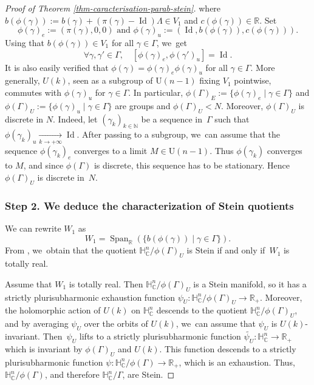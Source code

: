 \documentclass[11pt]{article}
\theoremstyle{definition}
\newcommand{\C}{\mathbb{C}}
\newcommand{\R}{\mathbb{R}}
\newcommand{\N}{\mathbb{N}}
\newcommand{\HNC}{\mathbb{H}^{n}_{\C}}
\DeclareMathOperator{\Id}{Id}
\def\C{\mathbb{C}}
\newcommand{\HNC}{\mathbb{H}^{n}_{\C}}
\begin{document}
\begin{proof}[Proof of Theorem \ref{thm-caracterisation-parab-stein}]
where $b(\phi(\gamma)):= b(\gamma) + (\pi(\gamma)-\Id)\Lambda \in V_1$ and $c(\phi(\gamma)) \in \R$. Set
\begin{equation*}
\phi(\gamma)_e:= (\pi(\gamma),0,0) \text{ and }
\phi(\gamma)_u:= (\Id,b(\phi(\gamma)),c(\phi(\gamma))).
\end{equation*}
Using that $b(\phi(\gamma))\in V_1$ for all $\gamma\in \Gamma$, we~get
\begin{equation*}
\forall \gamma,\gamma'\in \Gamma,\quad [\phi(\gamma)_e,\phi(\gamma')_u] = \Id.
\end{equation*}It is also easily verified that $\phi(\gamma) = \phi(\gamma)_e\phi(\gamma)_u$ for all $\gamma \in \Gamma$.
More generally, $U(k)$, seen as a subgroup of $\mathrm{U}(n-1)$ fixing $V_1$ pointwise, commutes with $\phi(\gamma)_u$ for $\gamma\in \Gamma$. In particular, $\phi(\Gamma)_E:= \{\phi(\gamma)_e \mid \gamma \in \Gamma\}$ and $\phi(\Gamma)_U:= \{\phi(\gamma)_u \mid \gamma \in \Gamma\}$ are groups and $\phi(\Gamma)_U<N$. Moreover, $\phi(\Gamma)_U$ is discrete in $N$. Indeed, let $(\gamma_k)_{k\in \N}$ be a sequence in~$\Gamma$ such that $\phi(\gamma_k)_u \underset{k\to +\infty}{\to} \Id$. After passing to a subgroup, we~can assume that the sequence $\phi(\gamma_k)_e$ converges to a limit $M\in \mathrm{U}(n-1)$. Thus $\phi(\gamma_k)$ converges to $M$, and since $\phi(\Gamma)$ is discrete, this sequence has to be stationary. Hence $\phi(\Gamma)_U$ is discrete in~$N$.

\subsubsection*{Step 2. We deduce the characterization of Stein quotients}

We can rewrite $W_1$ as
\begin{equation*}
W_1 = \operatorname{Span}_{\R}(\{b(\phi(\gamma)) \mid \gamma \in \Gamma\}).
\end{equation*}
From \cite[Th.\,1.4]{miebachQuotientsBoundedHomogeneous2024}, we~obtain that the quotient $\HNC/\phi(\Gamma)_U$ is Stein if and only if~$W_1$ is totally real.

Assume that $W_1$ is totally real. Then $\HNC/\phi(\Gamma)_U$ is a Stein manifold, so it has a strictly plurisubharmonic exhaustion function $\psi_U:\HNC/\phi(\Gamma)_U\to \R_+$. Moreover, the holomorphic action of $U(k)$ on $\HNC$ descends to the quotient $\HNC/\phi(\Gamma)_U$, and by averaging $\psi_U$ over the orbits of $U(k)$, we~can assume that $\psi_U$ is $U(k)$-invariant. Then~$\psi_U$ lifts to a strictly plurisubharmonic function $\widetilde{\psi_U}:\HNC\to \R_+$ which is invariant by $\phi(\Gamma)_U$ and $U(k)$. This function descends to a strictly plurisubharmonic function $\psi:\HNC/\phi(\Gamma)\to \R_+$, which is an exhaustion. Thus, $\HNC/\phi(\Gamma)$, and therefore $\HNC/\Gamma$, are Stein.


\end{proof}
\end{document}
